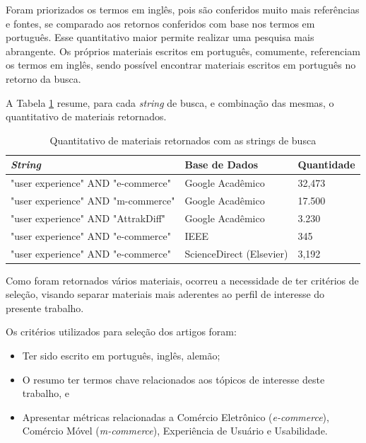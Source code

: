 Foram priorizados os termos em inglês, pois são conferidos muito mais referências e fontes, se comparado aos retornos conferidos com base nos termos em português. Esse quantitativo maior permite realizar uma pesquisa mais abrangente. Os próprios materiais escritos em português, comumente, referenciam os termos em inglês, sendo possível encontrar materiais escritos em português no retorno da busca.

A Tabela \ref{StringBase} resume, para cada \textit{string} de busca, e combinação das mesmas, o quantitativo de materiais retornados.

\begin{table}[]
\caption{\label{StringBase}Quantitativo de materiais retornados com as strings de busca}
\centering
\begin{tabular}{l|l|l}
\hline
\textit{String}                   & Base de Dados                                                           & Quantidade \\ \hline
"user experience" AND "e-commerce" & Google Acadêmico                                                        & 32,473     \\ \hline
"user experience" AND "m-commerce" & Google Acadêmico                                                        & 17.500     \\ \hline
"user experience" AND "AttrakDiff" & Google Acadêmico                                                        & 3.230      \\ \hline
"user experience" AND "e-commerce" & IEEE                                                                    & 345        \\ \hline
"user experience" AND "e-commerce" & ScienceDirect (Elsevier) & 3,192      \\ \hline
\end{tabular}
\end{table}

Como foram retornados vários materiais, ocorreu a necessidade de ter critérios de seleção, visando separar materiais mais aderentes ao perfil de interesse do presente trabalho.

Os critérios utilizados para seleção dos artigos foram:
\begin{itemize}
    \item Ter sido escrito em português, inglês, alemão;
    \item O resumo ter termos chave relacionados aos tópicos de interesse deste trabalho, e
    \item Apresentar métricas relacionadas a Comércio Eletrônico (\textit{e-commerce}), Comércio Móvel (\textit{m-commerce}), Experiência de Usuário e Usabilidade.
\end{itemize}

